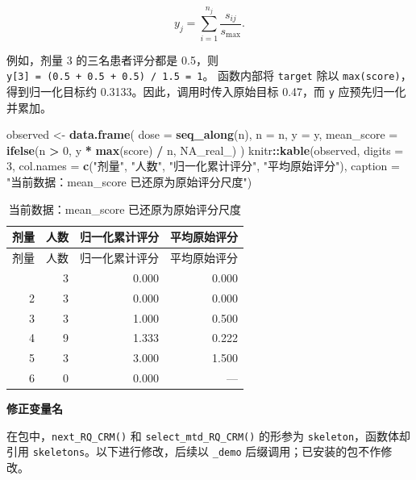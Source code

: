 \documentclass[
  chinese,
]{article}
\newenvironment{Shaded}{\begin{snugshade}}{\end{snugshade}}
\newcommand{\AttributeTok}[1]{\textcolor[rgb]{0.13,0.29,0.53}{#1}}
\newcommand{\ConstantTok}[1]{\textcolor[rgb]{0.56,0.35,0.01}{#1}}
\newcommand{\DecValTok}[1]{\textcolor[rgb]{0.00,0.00,0.81}{#1}}
\newcommand{\FunctionTok}[1]{\textcolor[rgb]{0.13,0.29,0.53}{\textbf{#1}}}
\newcommand{\NormalTok}[1]{#1}
\newcommand{\OtherTok}[1]{\textcolor[rgb]{0.56,0.35,0.01}{#1}}
\newcommand{\SpecialCharTok}[1]{\textcolor[rgb]{0.81,0.36,0.00}{\textbf{#1}}}
\newcommand{\StringTok}[1]{\textcolor[rgb]{0.31,0.60,0.02}{#1}}
\begin{document}
\[
y_j = \sum_{i=1}^{n_j}\frac{s_{ij}}{s_{\max}}.
\]

例如，剂量 3 的三名患者评分都是 0.5，则
\texttt{y{[}3{]}\ =\ (0.5\ +\ 0.5\ +\ 0.5)\ /\ 1.5\ =\ 1}。 函数内部将
\texttt{target} 除以 \texttt{max(score)}，得到归一化目标约
0.3133。因此，调用时传入原始目标 0.47，而 \texttt{y}
应预先归一化并累加。

\begin{Shaded}
\begin{Highlighting}[]
\NormalTok{observed }\OtherTok{\textless{}{-}} \FunctionTok{data.frame}\NormalTok{(}
  \AttributeTok{dose =} \FunctionTok{seq\_along}\NormalTok{(n),}
  \AttributeTok{n =}\NormalTok{ n,}
  \AttributeTok{y =}\NormalTok{ y,}
  \AttributeTok{mean\_score =} \FunctionTok{ifelse}\NormalTok{(n }\SpecialCharTok{\textgreater{}} \DecValTok{0}\NormalTok{, y }\SpecialCharTok{*} \FunctionTok{max}\NormalTok{(score) }\SpecialCharTok{/}\NormalTok{ n, }\ConstantTok{NA\_real\_}\NormalTok{)}
\NormalTok{)}
\NormalTok{knitr}\SpecialCharTok{::}\FunctionTok{kable}\NormalTok{(observed, }\AttributeTok{digits =} \DecValTok{3}\NormalTok{,}
             \AttributeTok{col.names =} \FunctionTok{c}\NormalTok{(}\StringTok{"剂量"}\NormalTok{, }\StringTok{"人数"}\NormalTok{, }\StringTok{"归一化累计评分"}\NormalTok{, }\StringTok{"平均原始评分"}\NormalTok{),}
             \AttributeTok{caption =} \StringTok{"当前数据：mean\_score 已还原为原始评分尺度"}\NormalTok{)}
\end{Highlighting}
\end{Shaded}

\begin{longtable}[]{@{}rrrr@{}}
\caption{当前数据：mean\_score 已还原为原始评分尺度}\tabularnewline
\toprule\noalign{}
剂量 & 人数 & 归一化累计评分 & 平均原始评分 \\
\midrule\noalign{}
\endfirsthead
\toprule\noalign{}
剂量 & 人数 & 归一化累计评分 & 平均原始评分 \\
\midrule\noalign{}
\endhead
\bottomrule\noalign{}
\endlastfoot
1 & 3 & 0.000 & 0.000 \\
2 & 3 & 0.000 & 0.000 \\
3 & 3 & 1.000 & 0.500 \\
4 & 9 & 1.333 & 0.222 \\
5 & 3 & 3.000 & 1.500 \\
6 & 0 & 0.000 & --- \\
\end{longtable}

\textbf{修正变量名}

在包中，\texttt{next\_RQ\_CRM()} 和 \texttt{select\_mtd\_RQ\_CRM()}
的形参为 \texttt{skeleton}，函数体却引用
\texttt{skeletons}。以下进行修改，后续以 \texttt{\_demo}
后缀调用；已安装的包不作修改。
\end{document}
